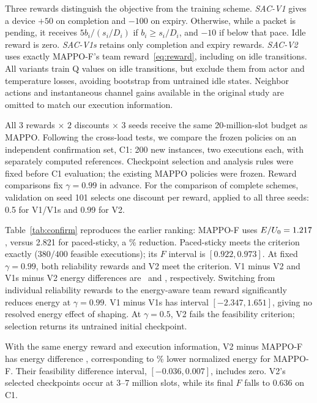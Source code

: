 Three rewards distinguish the objective from the training scheme.
\emph{SAC-V1} gives a device $+50$ on completion and $-100$ on expiry.
Otherwise, while a packet is pending, it receives $5b_i/(s_i/D_i)$ if
$b_i\ge s_i/D_i$, and $-10$ if below that pace. Idle reward is zero.
\emph{SAC-V1s} retains only completion and expiry rewards.
\emph{SAC-V2} uses exactly MAPPO-F's team reward~\eqref{eq:reward},
including on idle transitions. All variants train Q values on idle
transitions, but exclude them from actor and temperature losses, avoiding
bootstrap from untrained idle states. Neighbor actions and instantaneous
channel gains available in the original study are omitted to match our
execution information.

All $3$ rewards $\times$ $2$ discounts $\times$ $3$ seeds receive the same
20-million-slot budget as MAPPO. Following the cross-load tests, we compare
the frozen policies on an independent confirmation set, C1: 200 new
instances, two executions each, with separately computed references.
Checkpoint selection and analysis rules were fixed before C1 evaluation;
the existing MAPPO policies were frozen. Reward comparisons fix
$\gamma=0.99$ in advance. For the comparison of complete schemes, validation
on seed 101 selects one discount per reward, applied to all three seeds:
0.5 for V1/V1s and 0.99 for V2.

\begin{table}[t]
\caption{Selected checkpoints on confirmation set C1, $N=8$.
$\dagger$ marks $F<0.95$.}
\label{tab:confirm}
\centering\footnotesize\setlength{\tabcolsep}{3pt}

\end{table}

Table~\ref{tab:confirm} reproduces the earlier ranking: MAPPO-F uses
$E/U_0=1.217$, versus 2.821 for paced-sticky, a
\ConfirmSavingPaced\% reduction. Paced-sticky meets the criterion exactly
($380/400$ feasible executions); its $F$ interval is $[0.922,0.973]$.
At fixed $\gamma=0.99$, both reliability rewards and V2 meet the criterion.
V1 minus V2 and V1s minus V2 energy differences are
\ConfirmGapVOne\ and \ConfirmGapVSparse, respectively.
Switching from individual reliability rewards to the energy-aware team
reward significantly reduces energy at $\gamma=0.99$.
V1 minus V1s has interval $[-2.347,1.651]$, giving no resolved energy
effect of shaping.
At $\gamma=0.5$, V2 fails the feasibility criterion; selection returns
its untrained initial checkpoint.

With the same energy reward and execution information, V2 minus MAPPO-F
has energy difference \ConfirmGapSac, corresponding to
\ConfirmSavingSac\% lower normalized energy for MAPPO-F. Their feasibility
difference interval, $[-0.036,0.007]$, includes zero.
V2's selected checkpoints occur at 3--7 million slots, while its final $F$
falls to 0.636 on C1.

